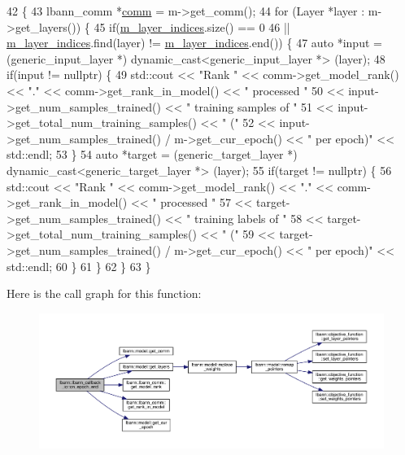 \begin{DoxyCode}
42                                              \{
43   lbann\_comm *\hyperlink{file__io_8cpp_ab048c6f9fcbcfaa57ce68b00263dbebe}{comm} = m->get\_comm();
44   \textcolor{keywordflow}{for} (Layer *layer : m->get\_layers()) \{
45     \textcolor{keywordflow}{if}(\hyperlink{classlbann_1_1lbann__callback__io_ab2105f5ed94c9c053b2873ea3a87bc21}{m\_layer\_indices}.size() == 0
46        || \hyperlink{classlbann_1_1lbann__callback__io_ab2105f5ed94c9c053b2873ea3a87bc21}{m\_layer\_indices}.find(layer) != \hyperlink{classlbann_1_1lbann__callback__io_ab2105f5ed94c9c053b2873ea3a87bc21}{m\_layer\_indices}.end()) \{
47       \textcolor{keyword}{auto} *input = (generic\_input\_layer *) dynamic\_cast<generic\_input\_layer *> (layer);
48       \textcolor{keywordflow}{if}(input != \textcolor{keyword}{nullptr}) \{
49         std::cout << \textcolor{stringliteral}{"Rank "} << comm->get\_model\_rank() << \textcolor{stringliteral}{"."} << comm->get\_rank\_in\_model() << \textcolor{stringliteral}{" processed "}
50                   << input->get\_num\_samples\_trained() << \textcolor{stringliteral}{" training samples of "}
51                   << input->get\_total\_num\_training\_samples() << \textcolor{stringliteral}{" ("}
52                   << input->get\_num\_samples\_trained() / m->get\_cur\_epoch() << \textcolor{stringliteral}{" per epoch)"} << std::endl;
53       \}
54       \textcolor{keyword}{auto} *target = (generic\_target\_layer *) dynamic\_cast<generic\_target\_layer *> (layer);
55       \textcolor{keywordflow}{if}(target != \textcolor{keyword}{nullptr}) \{
56         std::cout << \textcolor{stringliteral}{"Rank "} << comm->get\_model\_rank() << \textcolor{stringliteral}{"."} << comm->get\_rank\_in\_model() << \textcolor{stringliteral}{" processed "}
57                   << target->get\_num\_samples\_trained() << \textcolor{stringliteral}{" training labels of "}
58                   << target->get\_total\_num\_training\_samples() << \textcolor{stringliteral}{" ("}
59                   << target->get\_num\_samples\_trained() / m->get\_cur\_epoch() << \textcolor{stringliteral}{" per epoch)"} << std::endl;
60       \}
61     \}
62   \}
63 \}
\end{DoxyCode}
Here is the call graph for this function\+:\nopagebreak
\begin{figure}[H]
\begin{center}
\leavevmode
\includegraphics[width=350pt]{classlbann_1_1lbann__callback__io_a118c5cb8a9c83661a67569df890676e2_cgraph}
\end{center}
\end{figure}
